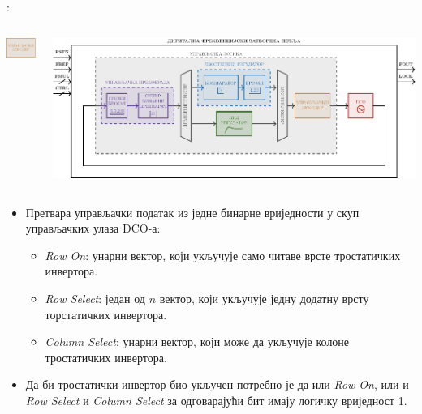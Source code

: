 \documentclass[aspectratio=169]{beamer}
\def \CtrlDecColor     {brown}
\def \DCO  {DCO} %
\begin{document}
\begin{frame}{\secname: \subsecname}
	\vspace{-0.6cm}
	\begin{columns}[t]
        \begin{column}{0.25\linewidth}
            \begin{center}
		    \vspace{0.4cm}
	        \includegraphics[scale=2.1]{slike/prezentacija/CTRL_DEC.pdf} 
	    \end{center}
        \end{column}
        \begin{column}{0.75\linewidth}
        	\begin{center}
            	\includegraphics[scale=0.5]{slike/prezentacija/FLL.pdf}
            \end{center}
        \end{column}
    \end{columns}
    \medskip
	\begin{itemize}
		\item Претвара управљачки податак из једне бинарне вриједности у скуп управљачких улаза \DCO-а:
        \begin{itemize}
		\color{\CtrlDecColor}
		\item \textsl{Row On}: унарни вектор, који укључује само читаве врсте тростатичких инвертора.
		\item \textsl{Row Select}: један од $n$ вектор, који укључује једну додатну врсту торстатичких инвертора.
		\item \textsl{Column Select}: унарни вектор, који може да укључује колоне тростатичких инвертора.
		\end{itemize}
		\smallskip
	\item Да би тростатички инвертор био укључен потребно је да или \textsl{Row On}, или и \textsl{Row Select} и \textsl{Column Select} за одговарајући бит имају логичку вриједност 1.%
	\end{itemize}
\end{frame}
\end{document}
